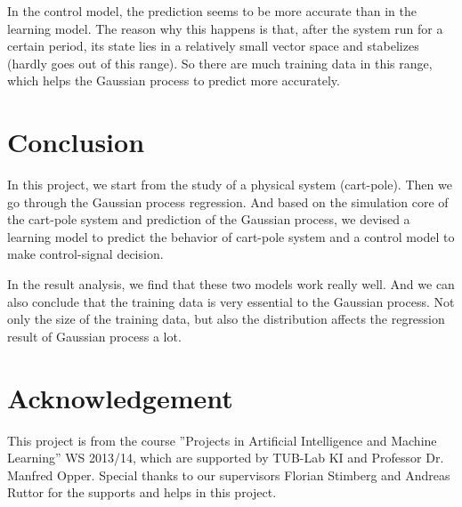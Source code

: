 \documentclass[11pt,twoside,a4paper]{article}
\begin{document}
In the control model, the prediction seems to be more accurate than in
the learning model. The reason why this happens is that, after the
system run for a certain period, its state lies in a relatively small
vector space and stabelizes (hardly goes out of this range). So
there are much training data in this range, which helps the Gaussian
process to predict more accurately.\\

\section{Conclusion}

In this project, we start from the study of a physical system
(cart-pole). Then we go through the Gaussian process regression. And
based on the simulation core of the cart-pole system and prediction of
the Gaussian process, we devised a learning model to predict the
behavior of cart-pole system and a control model to make
control-signal decision.

In the result analysis, we find that these two models work really
well. And we can also conclude that the training data is very
essential to the Gaussian process. Not only the size of the training
data, but also the distribution affects the regression result of
Gaussian process a lot.

\section{Acknowledgement}
This project is from the course ''Projects in Artificial Intelligence and Machine Learning'' WS 2013/14, which are supported by TUB-Lab KI and Professor Dr. Manfred Opper. Special thanks to our supervisors Florian Stimberg and Andreas Ruttor for the supports and helps in this project.

\newpage

{}
\end{document}
